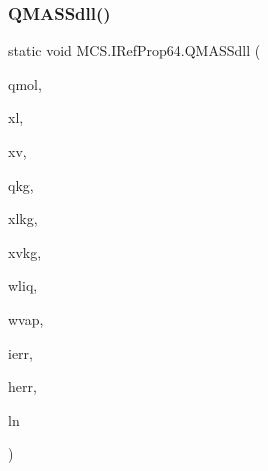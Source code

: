 \subsubsection{\texorpdfstring{Q\+M\+A\+S\+Sdll()}{QMASSdll()}}
{\footnotesize\ttfamily static void M\+C\+S.\+I\+Ref\+Prop64.\+Q\+M\+A\+S\+Sdll (\begin{DoxyParamCaption}\item[{ref double}]{qmol,  }\item[{\mbox{[}\+Marshal\+As(\+Unmanaged\+Type.\+L\+P\+Array, Size\+Param\+Index=0)\mbox{]} double \mbox{[}$\,$\mbox{]}}]{xl,  }\item[{\mbox{[}\+Marshal\+As(\+Unmanaged\+Type.\+L\+P\+Array, Size\+Param\+Index=0)\mbox{]} double \mbox{[}$\,$\mbox{]}}]{xv,  }\item[{ref double}]{qkg,  }\item[{\mbox{[}\+Marshal\+As(\+Unmanaged\+Type.\+L\+P\+Array, Size\+Param\+Index=0)\mbox{]} double \mbox{[}$\,$\mbox{]}}]{xlkg,  }\item[{\mbox{[}\+Marshal\+As(\+Unmanaged\+Type.\+L\+P\+Array, Size\+Param\+Index=0)\mbox{]} double \mbox{[}$\,$\mbox{]}}]{xvkg,  }\item[{ref double}]{wliq,  }\item[{ref double}]{wvap,  }\item[{ref long}]{ierr,  }\item[{\mbox{[}\+Marshal\+As(\+Unmanaged\+Type.\+V\+B\+By\+Ref\+Str)\mbox{]} ref string}]{herr,  }\item[{ref long}]{ln }\end{DoxyParamCaption})}

\hypertarget{class_m_c_s_1_1_i_ref_prop64_aec0d80ac48b63f419b15fb52f7c458b5}{}\label{class_m_c_s_1_1_i_ref_prop64_aec0d80ac48b63f419b15fb52f7c458b5} 
